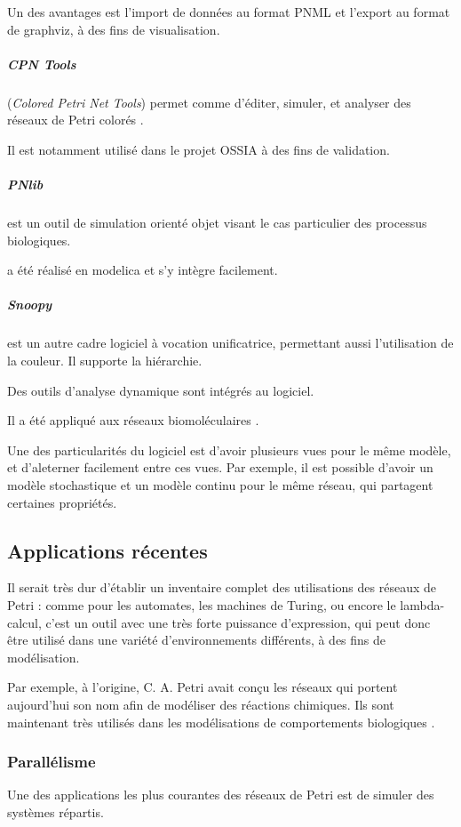 Un des avantages est l'import de données au format \ac{PNML} et l'export au format  de \gls{graphviz}, à des fins de visualisation.

\subparagraph{CPN Tools} (\textit{Colored Petri Net Tools}) permet comme  d'éditer, simuler, et analyser des réseaux de Petri colorés \cite{jensen2007coloured}.

Il est notamment utilisé dans le projet \ac{OSSIA} à des fins de validation.

\subparagraph{PNlib}  \cite{pross2014object} est un outil de simulation orienté objet visant le cas particulier des processus biologiques.

 a été réalisé en \gls{modelica} et s'y intègre facilement.

\subparagraph{Snoopy} \cite{heiner2012snoopy} est un autre cadre logiciel à vocation unificatrice, permettant aussi l'utilisation de la couleur. Il supporte la hiérarchie.

Des outils d'analyse dynamique sont intégrés au logiciel.

Il a été appliqué aux réseaux biomoléculaires \cite{rohr2010snoopy}.

Une des particularités du logiciel est d'avoir plusieurs vues pour le même modèle, et d'aleterner facilement entre ces vues. Par exemple, il est possible d'avoir un modèle stochastique et un modèle continu pour le même réseau, qui partagent certaines propriétés.

\subsection{Applications récentes}
Il serait très dur d'établir un inventaire complet des utilisations des réseaux de Petri : comme pour les automates, les machines de Turing, ou encore le lambda-calcul, c'est un outil avec une très forte puissance d'expression, qui peut donc être utilisé dans une variété d'environnements différents, à des fins de modélisation.

Par exemple, à l'origine, C. A. Petri avait conçu les réseaux qui portent aujourd'hui son nom afin de modéliser des réactions chimiques. Ils sont maintenant très utilisés dans les modélisations de comportements biologiques \cite{koch2014petri}.

\subsubsection{Parallélisme}
Une des applications les plus courantes des réseaux de Petri est de simuler des systèmes répartis.

